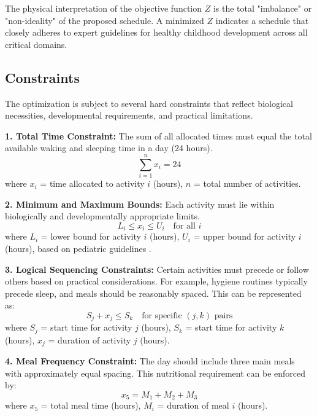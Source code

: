 \documentclass[10pt,conference,compsocconf]{IEEEtran}
\begin{document}
The physical interpretation of the objective function $Z$ is the total "imbalance" or "non-ideality" of the proposed schedule. A minimized $Z$ indicates a schedule that closely adheres to expert guidelines for healthy childhood development across all critical domains.

\subsection{Constraints}

The optimization is subject to several hard constraints that reflect biological necessities, developmental requirements, and practical limitations.

\textbf{1. Total Time Constraint:} The sum of all allocated times must equal the total available waking and sleeping time in a day (24 hours).
\begin{equation}
\sum_{i=1}^{n} x_i = 24
\end{equation}
where $x_i$ = time allocated to activity $i$ (hours), $n$ = total number of activities.

\textbf{2. Minimum and Maximum Bounds:} Each activity must lie within biologically and developmentally appropriate limits.
\begin{equation}
L_i \leq x_i \leq U_i \quad \text{for all } i
\end{equation}
where $L_i$ = lower bound for activity $i$ (hours), $U_i$ = upper bound for activity $i$ (hours), based on pediatric guidelines \cite{aap2016sleep,who2019guidelines}.

\textbf{3. Logical Sequencing Constraints:} Certain activities must precede or follow others based on practical considerations. For example, hygiene routines typically precede sleep, and meals should be reasonably spaced. This can be represented as:
\begin{equation}
S_j + x_j \leq S_k \quad \text{for specific } (j,k) \text{ pairs}
\end{equation}
where $S_j$ = start time for activity $j$ (hours), $S_k$ = start time for activity $k$ (hours), $x_j$ = duration of activity $j$ (hours).

\textbf{4. Meal Frequency Constraint:} The day should include three main meals with approximately equal spacing. This nutritional requirement can be enforced by:
\begin{equation}
x_5 = M_1 + M_2 + M_3
\end{equation}
where $x_5$ = total meal time (hours), $M_i$ = duration of meal $i$ (hours).
\end{document}
